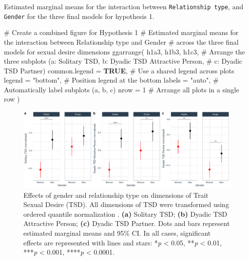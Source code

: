 \documentclass[
  bookmarksnumbered]{article}
\newenvironment{Shaded}{\begin{snugshade}}{\end{snugshade}}
\newcommand{\AttributeTok}[1]{\textcolor[rgb]{0.80,0.80,0.80}{#1}}
\newcommand{\CommentTok}[1]{\textcolor[rgb]{0.50,0.62,0.50}{#1}}
\newcommand{\ConstantTok}[1]{\textcolor[rgb]{0.86,0.64,0.64}{\textbf{#1}}}
\newcommand{\DecValTok}[1]{\textcolor[rgb]{0.86,0.86,0.80}{#1}}
\newcommand{\FunctionTok}[1]{\textcolor[rgb]{0.94,0.94,0.56}{#1}}
\newcommand{\NormalTok}[1]{\textcolor[rgb]{0.80,0.80,0.80}{#1}}
\newcommand{\StringTok}[1]{\textcolor[rgb]{0.80,0.58,0.58}{#1}}
\begin{document}
Estimated marginal means for the interaction between \texttt{Relationship\ type}, and \texttt{Gender} for the three final models for hypothesis 1.

\begin{Shaded}
\begin{Highlighting}[]
\CommentTok{\# Create a combined figure for Hypothesis 1}
\CommentTok{\# Estimated marginal means for the interaction between Relationship type and Gender}
\CommentTok{\# across the three final models for sexual desire dimensions}
\FunctionTok{ggarrange}\NormalTok{(}
\NormalTok{  h1a3, h1b3, h1c3, }\CommentTok{\# Arrange the three subplots (a: Solitary TSD, b: Dyadic TSD Attractive Person,}
  \CommentTok{\# c: Dyadic TSD Partner)}
  \AttributeTok{common.legend =} \ConstantTok{TRUE}\NormalTok{, }\CommentTok{\# Use a shared legend across plots}
  \AttributeTok{legend =} \StringTok{"bottom"}\NormalTok{, }\CommentTok{\# Position legend at the bottom}
  \AttributeTok{labels =} \StringTok{"auto"}\NormalTok{, }\CommentTok{\# Automatically label subplots (a, b, c)}
  \AttributeTok{nrow =} \DecValTok{1} \CommentTok{\# Arrange all plots in a single row}
\NormalTok{)}
\end{Highlighting}
\end{Shaded}

\begin{figure}
\centering
\includegraphics{Sexual_Desire_Arousal_anonymous_files/figure-latex/fig-m1-fin-1.pdf}
\caption{\label{fig:fig-m1-fin}Effects of gender and relationship type on dimensions of Trait Sexual Desire (TSD). All dimensions of TSD were transformed using ordered quantile normalization \autocite{petersonOrderedQuantileNormalization2020a}. \textbf{(a)} Solitary TSD; \textbf{(b)} Dyadic TSD Attractive Person; \textbf{(c)} Dyadic TSD Partner. Dots and bars represent estimated marginal means and 95\% CI. In all cases, significant effects are represented with lines and stars: *\emph{p} \textless{} 0.05, **\emph{p} \textless{} 0.01, ***\emph{p} \textless{} 0.001, ****\emph{p} \textless{} 0.0001.}
\end{figure}
\end{document}
